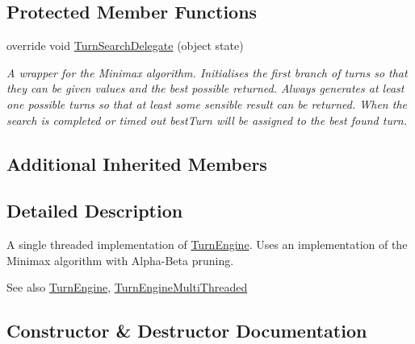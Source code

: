 \subsection*{Protected Member Functions}
\begin{DoxyCompactItemize}
\item 
override void \hyperlink{class_universal_turn_based_a_i_1_1_turn_engine_single_threaded_a2ae467b6b27ec5e2dfe1d033c86ea4d8}{Turn\+Search\+Delegate} (object state)
\begin{DoxyCompactList}\small\item\em A wrapper for the Minimax algorithm. Initialises the first branch of turns so that they can be given values and the best possible returned. Always generates at least one possible turns so that at least some sensible result can be returned. When the search is completed or timed out best\+Turn will be assigned to the best found turn. \end{DoxyCompactList}\end{DoxyCompactItemize}
\subsection*{Additional Inherited Members}


\subsection{Detailed Description}
A single threaded implementation of \hyperlink{class_universal_turn_based_a_i_1_1_turn_engine}{Turn\+Engine}. Uses an implementation of the Minimax algorithm with Alpha-\/\+Beta pruning. 

\begin{DoxySeeAlso}{See also}
\hyperlink{class_universal_turn_based_a_i_1_1_turn_engine}{Turn\+Engine}, \hyperlink{class_universal_turn_based_a_i_1_1_turn_engine_multi_threaded}{Turn\+Engine\+Multi\+Threaded}


\end{DoxySeeAlso}


\subsection{Constructor \& Destructor Documentation}
\hypertarget{class_universal_turn_based_a_i_1_1_turn_engine_single_threaded_a0c58e0d032bc0ae478d4cc2c81f08b5a}{}
